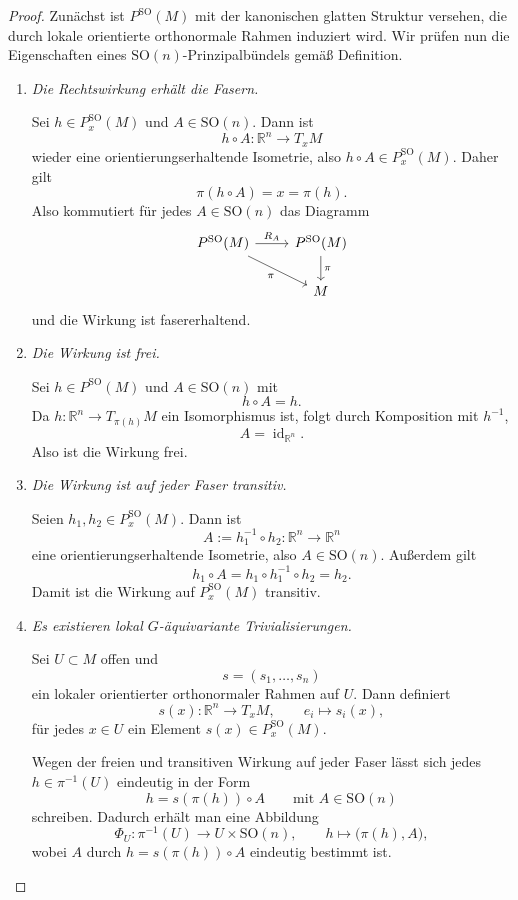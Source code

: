 \documentclass[10pt, letterpaper]{article}
\newcommand{\id}{\operatorname{id}}
\newcommand{\R}{\mathbb{R}}
\newcommand{\SO}{\mathrm{SO}}
\begin{document}
\begin{proof}
Zunächst ist \(P^{\SO}(M)\) mit der kanonischen glatten Struktur versehen, die
durch lokale orientierte orthonormale Rahmen induziert wird. Wir prüfen nun die
Eigenschaften eines \(\SO(n)\)-Prinzipalbündels gemäß Definition.

\begin{enumerate}
    \item \emph{Die Rechtswirkung erhält die Fasern.}

    Sei \(h\in P_x^{\SO}(M)\) und \(A\in \SO(n)\). Dann ist
    \[
    h\circ A:\R^n\to T_xM
    \]
    wieder eine orientierungserhaltende Isometrie, also \(h\circ A\in P_x^{\SO}(M)\).
    Daher gilt
    \[
    \pi(h\circ A)=x=\pi(h).
    \]
    Also kommutiert für jedes \(A\in \SO(n)\) das Diagramm
    \[
    \begin{tikzcd}
    P^{\SO}(M) \arrow[r,"R_A"] \arrow[dr,"\pi"'] & P^{\SO}(M) \arrow[d,"\pi"] \\
    & M
    \end{tikzcd}
    \]
    und die Wirkung ist fasererhaltend.

    \item \emph{Die Wirkung ist frei.}

    Sei \(h\in P^{\SO}(M)\) und \(A\in \SO(n)\) mit
    \[
    h\circ A = h.
    \]
    Da \(h:\R^n\to T_{\pi(h)}M\) ein Isomorphismus ist, folgt durch Komposition mit
    \(h^{-1}\),
    \[
    A=\id_{\R^n}.
    \]
    Also ist die Wirkung frei.

    \item \emph{Die Wirkung ist auf jeder Faser transitiv.}

    Seien \(h_1,h_2\in P_x^{\SO}(M)\). Dann ist
    \[
    A:=h_1^{-1}\circ h_2:\R^n\to\R^n
    \]
    eine orientierungserhaltende Isometrie, also \(A\in \SO(n)\). Außerdem gilt
    \[
    h_1\circ A = h_1\circ h_1^{-1}\circ h_2 = h_2.
    \]
    Damit ist die Wirkung auf \(P_x^{\SO}(M)\) transitiv.

    \item \emph{Es existieren lokal \(G\)-äquivariante Trivialisierungen.}

    Sei \(U\subset M\) offen und
    \[
    s=(s_1,\dots,s_n)
    \]
    ein lokaler orientierter orthonormaler Rahmen auf \(U\). Dann definiert
    \[
    s(x):\R^n\to T_xM,\qquad e_i\mapsto s_i(x),
    \]
    für jedes \(x\in U\) ein Element \(s(x)\in P_x^{\SO}(M)\).

    Wegen der freien und transitiven Wirkung auf jeder Faser lässt sich jedes
    \(h\in \pi^{-1}(U)\) eindeutig in der Form
    \[
    h=s(\pi(h))\circ A
    \qquad\text{mit }A\in \SO(n)
    \]
    schreiben. Dadurch erhält man eine Abbildung
    \[
    \Phi_U:\pi^{-1}(U)\to U\times \SO(n),\qquad
    h\mapsto \bigl(\pi(h),A\bigr),
    \]
    wobei \(A\) durch \(h=s(\pi(h))\circ A\) eindeutig bestimmt ist.


\end{enumerate}
\end{proof}
\end{document}
